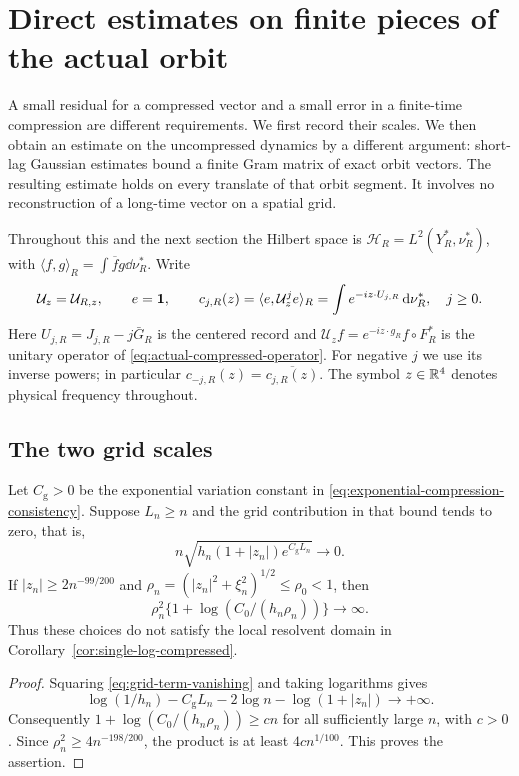 \section{Direct estimates on finite pieces of the actual orbit}
\label{sec:direct-orbit-bounds}
A small residual for a compressed vector and a small error in a
finite-time compression are different requirements. We first record
their scales. We then obtain an estimate on the uncompressed dynamics
by a different argument: short-lag Gaussian estimates bound a finite
Gram matrix of exact orbit vectors. The resulting estimate holds on
every translate of that orbit segment. It involves no reconstruction
of a long-time vector on a spatial grid.

Throughout this and the next section the Hilbert space is
$\mathcal H_R=L^2(Y_R^*,\nu_R^*)$, with
$\langle f,g\rangle_R=\int\overline f g\dd\nu_R^*$.
Write
\begin{equation}\label{eq:direct-orbit-convention}
 \mathcal U_z=\mathcal U_{R,z},\qquad e=\one,\qquad
 c_{j,R}(z)=\langle e,\mathcal U_z^j e\rangle_R
       =\int e^{-iz\cdot U_{j,R}}\dd\nu_R^*,\quad j\ge0.
\end{equation}
Here $U_{j,R}=J_{j,R}-j\bar G_R$ is the centered record and
$\mathcal U_z f=e^{-iz\cdot g_R}f\circ F_R^*$ is the unitary
operator of \eqref{eq:actual-compressed-operator}. For negative $j$
we use its inverse powers; in particular
$c_{-j,R}(z)=\overline{c_{j,R}(z)}$. The symbol $z\in\mathbb R^4$ denotes
physical frequency throughout.

\subsection{The two grid scales}
\begin{proposition}
\label{prop:grid-scale-separation}
Let $C_{\mathrm g}>0$ be the exponential variation constant in
\eqref{eq:exponential-compression-consistency}. Suppose $L_n\ge n$
and the grid contribution in that bound tends to zero, that is,
\begin{equation}\label{eq:grid-term-vanishing}
 n\sqrt{h_n(1+|z_n|)e^{C_{\mathrm g}L_n}}\longrightarrow0.
\end{equation}
If $|z_n|\ge2n^{-99/200}$ and
$\rho_n=(|z_n|^2+\xi_n^2)^{1/2}\le\rho_0<1$, then
\[
 \rho_n^2\{1+\log(C_0/(h_n\rho_n))\}\longrightarrow\infty.
\]
Thus these choices do not satisfy the local resolvent domain in
Corollary~\ref{cor:single-log-compressed}.
\end{proposition}
\begin{proof}
Squaring \eqref{eq:grid-term-vanishing} and taking logarithms gives
\[
 \log(1/h_n)-C_{\mathrm g}L_n-2\log n
                 -\log(1+|z_n|)\longrightarrow+\infty.
\]
Consequently $1+\log(C_0/(h_n\rho_n))\ge c n$ for all sufficiently
large $n$, with $c>0$. Since $\rho_n^2\ge4n^{-198/200}$, the product
is at least $4c n^{1/100}$. This proves the assertion.
\end{proof}

